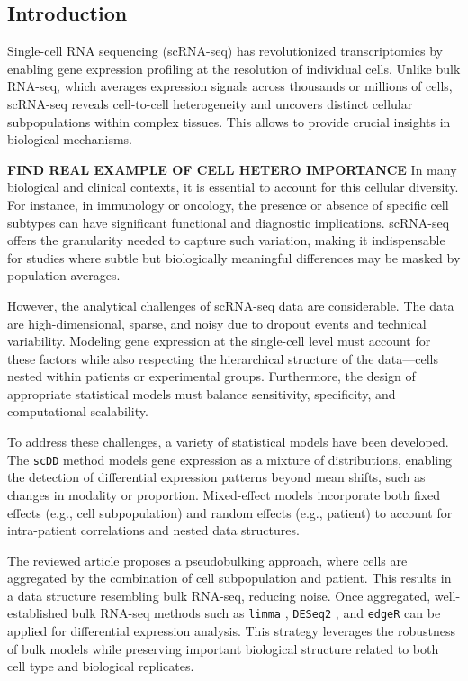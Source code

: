 \documentclass[a4paper, 11pt, twocolumn]{article}
\begin{document}
\begin{multicols}{2}
\section{Introduction}

Single-cell RNA sequencing (scRNA-seq) has revolutionized transcriptomics by enabling gene expression profiling at the resolution of individual cells. Unlike bulk RNA-seq, which averages expression signals across thousands or millions of cells, scRNA-seq reveals cell-to-cell heterogeneity and uncovers distinct cellular subpopulations within complex tissues. This allows to provide crucial insights in biological mechanisms.

\textbf{FIND REAL EXAMPLE OF CELL HETERO IMPORTANCE}
In many biological and clinical contexts, it is essential to account for this cellular diversity. For instance, in immunology or oncology, the presence or absence of specific cell subtypes can have significant functional and diagnostic implications. scRNA-seq offers the granularity needed to capture such variation, making it indispensable for studies where subtle but biologically meaningful differences may be masked by population averages.

However, the analytical challenges of scRNA-seq data are considerable. The data are high-dimensional, sparse, and noisy due to dropout events and technical variability. Modeling gene expression at the single-cell level must account for these factors while also respecting the hierarchical structure of the data—cells nested within patients or experimental groups. Furthermore, the design of appropriate statistical models must balance sensitivity, specificity, and computational scalability.

To address these challenges, a variety of statistical models have been developed. The \texttt{scDD} method \citep{scdd} models gene expression as a mixture of distributions, enabling the detection of differential expression patterns beyond mean shifts, such as changes in modality or proportion. Mixed-effect models  incorporate both fixed effects (e.g., cell subpopulation) and random effects (e.g., patient) to account for intra-patient correlations and nested data structures.

The reviewed article \citep{muscat} proposes a pseudobulking approach, where cells are aggregated by the combination of cell subpopulation and patient. This results in a data structure resembling bulk RNA-seq, reducing noise. Once aggregated, well-established bulk RNA-seq methods such as \texttt{limma} \citep{limma}, \texttt{DESeq2} \citep{deseq2}, and \texttt{edgeR} \citep{edger} can be applied for differential expression analysis. This strategy leverages the robustness of bulk models while preserving important biological structure related to both cell type and biological replicates.



\end{multicols}
\end{document}
